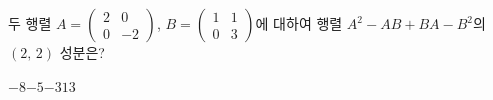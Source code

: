 \hspace*{2mm}\begin{minipage}[t]{\dimexpr\linewidth-2mm\relax}\vspace{0pt}
두 행렬 $A=\begin{pmatrix} 2 & 0 \\ 0 & -2 \end{pmatrix}$, $B=\begin{pmatrix} 1 & 1 \\ 0 & 3 \end{pmatrix}$에 대하여 행렬 $A^2-AB+BA-B^2$의 $(2,\,2)$ 성분은?
\begin{choices32}{$-8$}{$-5$}{$-3$}{$1$}{$3$}\end{choices32}\end{minipage}
